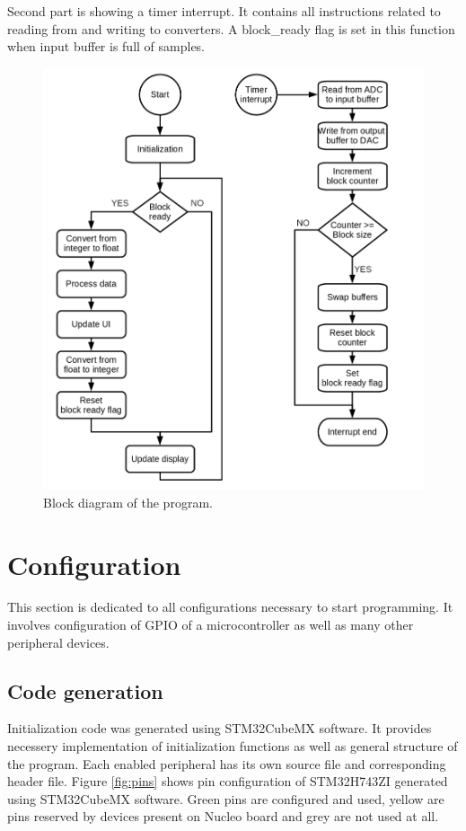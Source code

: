 \documentclass[a4paper,twoside,12pt]{book}
\begin{document}
Second part is showing a timer interrupt.
It contains all instructions related
to reading from and writing to converters.
A block\_ready flag is set in this function
when input buffer is full of samples.

\newpage

\begin{figure}[H]
    \centering
    \includegraphics[width=\textwidth]{images/Block2}
    \caption{Block diagram of the program.}
    \label{fig:block2}
\end{figure}

\section{Configuration}
This section is dedicated to all configurations necessary to start programming.
It involves configuration of GPIO of a microcontroller as well as
many other peripheral devices.

\subsection{Code generation}

Initialization code was generated using STM32CubeMX software.
It provides necessery implementation of initialization functions
as well as general structure of the program.
Each enabled peripheral has its own source file
and corresponding header file.
Figure \ref{fig:pins} shows pin configuration of STM32H743ZI
generated using STM32CubeMX software.
Green pins are configured and used, yellow are pins reserved by
devices present on Nucleo board and grey are not used at all.
\end{document}

